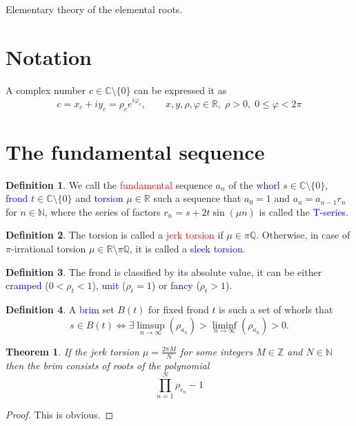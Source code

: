 \documentclass{article}
\def\bc{\begin{center}}
\def\ec{\end{center}}
\newcommand{\red}[1]{\textcolor{red}{#1}}
\newcommand{\blue}[1]{\textcolor{blue}{#1}}
\theoremstyle{plain}
\newtheorem{theorem}{Theorem}[section]
\theoremstyle{definition}
\newtheorem{definition}{Definition}[section]
\newcommand{\cmz}{\mathbb C \setminus \{0\} }
\newcommand{\pir}{\pi \mathbb Q }
\newcommand{\pirr}{\mathbb R \setminus \pi \mathbb Q }
\begin{document}
\bc
\Huge
	Elementary theory of the elemental roots.
\ec


\section{Notation}
A complex number $c \in \cmz $ can be expressed it as $$
  c = x_c + iy_c = \rho_c e^{i\varphi_c}, \qquad x,y,\rho,\varphi \in \mathbb R, \; \rho > 0, \; 0 \le \varphi < 2\pi
$$
\section{The fundamental sequence}

\begin{definition}
We call the \red{fundamental} sequence  $a_n$ of the \blue{whorl} $s \in \cmz$,  \blue{frond} $t \in \cmz$ and \blue{torsion} $\mu \in \mathbb R$ such a sequence that $a_0=1$ and $a_n = a_{n-1}r_n$ for $n\in \mathbb N$, where the series of factors $r_n = s + 2t \sin (\mu n)$ is called the \blue{T-series}.   
\end{definition}

\begin{definition}
The torsion is called a \red{jerk torsion} if $\mu \in \pir$. Otherwise, in case of $\pi$-irrational torsion $\mu \in \pirr$, it is called a \blue{sleek torsion}. 
\end{definition} 

\begin{definition}
The frond is classified by its absolute value, it can be either \blue{cramped} ($0< \rho_t<1$), \blue{unit} ($\rho_t=1$) or \blue{fancy} ($\rho_t>1$).
\end{definition} 

\begin{definition}\label{def:brim}
A \blue{brim} set $B(t)$ for fixed frond $t$ is such a set of whorls that $$
s \in B(t) \Leftrightarrow \exists \limsup_{n \to \infty}(\rho_{a_n})>\liminf_{n \to \infty}(\rho_{a_n})>0
.$$  
\end{definition} 

\begin{theorem}
If the jerk torsion $\mu = \frac{2\pi M}{N}$ for some integers $M \in \mathbb Z$ and $N \in \mathbb N$ then the brim consists of roots of the polynomial$$
\prod_{n=1}^{N} \rho_{r_n} - 1
$$
\end{theorem}
\begin{proof}
This is obvious.%
\end{proof}
\end{document}
